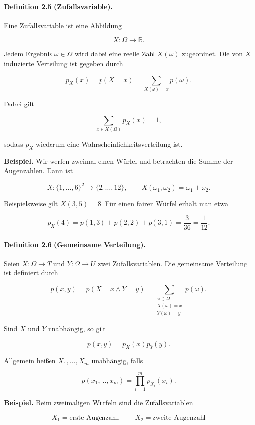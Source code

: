 \documentclass{article}
\begin{document}
\paragraph{Definition 2.5 (Zufallsvariable).}
Eine Zufallsvariable ist eine Abbildung

\[
X:\Omega\to\mathbb{R}.
\]

Jedem Ergebnis \(\omega\in\Omega\) wird dabei eine reelle Zahl
\(X(\omega)\) zugeordnet. Die von \(X\) induzierte Verteilung ist gegeben durch

\[
p_X(x)
=
p(X=x)
=
\sum_{X(\omega)=x} p(\omega).
\]

Dabei gilt

\[
\sum_{x\in X(\Omega)} p_X(x)=1,
\]

sodass \(p_X\) wiederum eine Wahrscheinlichkeitsverteilung ist.

\textbf{Beispiel.}
Wir werfen zweimal einen Würfel und betrachten die Summe der Augenzahlen. Dann ist

\[
X:\{1,\dots,6\}^2\to\{2,\dots,12\},
\qquad
X(\omega_1,\omega_2)=\omega_1+\omega_2.
\]

Beispielsweise gilt \(X(3,5)=8\). Für einen fairen Würfel erhält man etwa

\[
p_X(4)
=
p(1,3)+p(2,2)+p(3,1)
=
\frac{3}{36}
=
\frac{1}{12}.
\]

\medskip

\paragraph{Definition 2.6 (Gemeinsame Verteilung).}
Seien \(X:\Omega\to T\) und \(Y:\Omega\to U\) zwei Zufallsvariablen. Die gemeinsame Verteilung ist definiert durch

\[
p(x,y)
=
p(X=x\land Y=y)
=
\sum_{\substack{\omega\in\Omega\\ X(\omega)=x\\ Y(\omega)=y}}
p(\omega).
\]

Sind \(X\) und \(Y\) unabhängig, so gilt

\[
p(x,y)=p_X(x)p_Y(y).
\]

Allgemein heißen \(X_1,\dots,X_m\) unabhängig, falls

\[
p(x_1,\dots,x_m)
=
\prod_{i=1}^{m}p_{X_i}(x_i).
\]

\medskip

\textbf{Beispiel.}
Beim zweimaligen Würfeln sind die Zufallsvariablen

\[
X_1=\text{erste Augenzahl},
\qquad
X_2=\text{zweite Augenzahl}
\]
\end{document}
